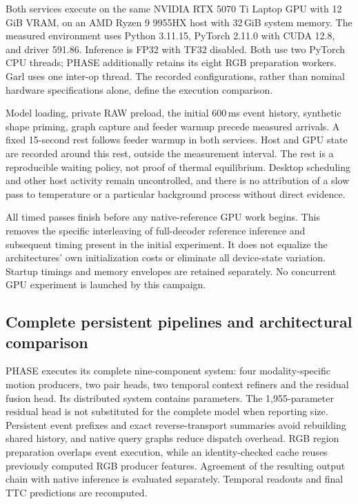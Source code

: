 Both services execute on the same NVIDIA RTX 5070 Ti Laptop GPU with 12\,GiB VRAM, on an AMD Ryzen 9 9955HX host with 32\,GiB system memory. The measured environment uses Python 3.11.15, PyTorch 2.11.0 with CUDA 12.8, and driver 591.86. Inference is FP32 with TF32 disabled. Both use two PyTorch CPU threads; PHASE additionally retains its eight RGB preparation workers. Garl uses one inter-op thread. The recorded configurations, rather than nominal hardware specifications alone, define the execution comparison.

Model loading, private RAW preload, the initial 600\,ms event history, synthetic shape priming, graph capture and feeder warmup precede measured arrivals. A fixed 15-second rest follows feeder warmup in both services. Host and GPU state are recorded around this rest, outside the measurement interval. The rest is a reproducible waiting policy, not proof of thermal equilibrium. Desktop scheduling and other host activity remain uncontrolled, and there is no attribution of a slow pass to temperature or a particular background process without direct evidence.

All timed passes finish before any native-reference GPU work begins. This removes the specific interleaving of full-decoder reference inference and subsequent timing present in the initial experiment. It does not equalize the architectures' own initialization costs or eliminate all device-state variation. Startup timings and memory envelopes are retained separately. No concurrent GPU experiment is launched by this campaign.

\begin{table}[H]
\centering\small
\caption{\textbf{Observed GPU state after the pre-stream rest.} Ranges are point-in-time observations across attempts, not continuous telemetry or temperature control. They do not identify the cause of an individual delay.}

\end{table}

\subsection{Complete persistent pipelines and architectural comparison}

PHASE executes its complete nine-component system: four modality-specific motion producers, two pair heads, two temporal context refiners and the residual fusion head. Its distributed system contains \LocalPhaseParameters{} parameters. The 1,955-parameter residual head is not substituted for the complete model when reporting size. Persistent event prefixes and exact reverse-transport summaries avoid rebuilding shared history, and native query graphs reduce dispatch overhead. RGB region preparation overlaps event execution, while an identity-checked cache reuses previously computed RGB producer features. Agreement of the resulting output chain with native inference is evaluated separately. Temporal readouts and final TTC predictions are recomputed.

